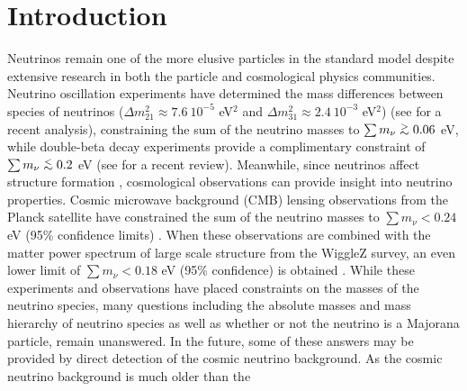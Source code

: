\documentclass[twocolumn,superscriptaddress,prd]{revtex4}
\def\ltsima{$\; \buildrel < \over \sim \;$}
\def\lsim{\lower.5ex\hbox{\ltsima}}
\def\gtsima{$\; \buildrel > \over \sim \;$}
\def\gsim{\lower.5ex\hbox{\gtsima}}
\begin{document}
\maketitle



\section{Introduction}
\label{sec:Introduction}

Neutrinos remain one of the more elusive particles in the
standard model despite extensive research in both the particle and
cosmological physics communities.  Neutrino oscillation experiments
have determined the mass differences between species of
neutrinos ($\Delta m_{21}^2 \approx 7.6~10^{-5} $ eV$^2$ and
$\Delta m_{31}^2 \approx 2.4~10^{-3}$ eV$^2$) (see \cite{schwetz11} 
for a recent analysis), constraining the sum of the neutrino
masses to $\sum m_\nu \gsim 0.06$ eV, while double-beta decay experiments
provide a complimentary constraint of  $\sum m_\nu \lsim 0.2$ eV (see
\cite{guzowski15} for a recent review). Meanwhile, since neutrinos affect
structure formation \cite{lesgourgues06,wong11}, cosmological observations can provide
 insight into neutrino properties.  
Cosmic microwave background (CMB) lensing observations from the Planck
satellite have constrained the sum of the neutrino masses to $\sum
m_\nu < 0.24$ eV (95\% confidence limits) \cite{planck15nu}.  When these observations are
combined with the matter power spectrum of large scale structure from
the WiggleZ survey, an even lower limit of $\sum m_\nu < 0.18$ eV (95\%
confidence) is obtained \cite{wigglez}. 
While these experiments and observations have placed constraints on
the 
masses of the neutrino species, many questions including the absolute masses and mass hierarchy of
neutrino species as well as whether or not the neutrino is a Majorana
particle,  remain unanswered.  In the future, some of these answers
may be provided by direct detection of the cosmic neutrino
background.  As the cosmic neutrino background is much older than the
\end{document}
